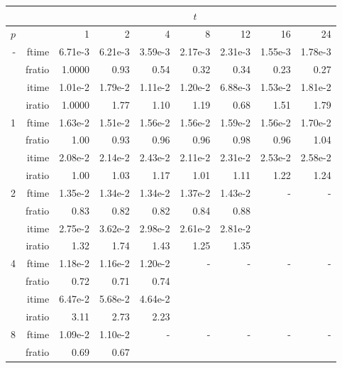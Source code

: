 \documentclass[a4]{article}
\begin{document}
\begin{table}
\begin{center}
\begin{tabular}{|r|r|r|r|r|r|r|r|r|}
\hline 
     &  & \multicolumn{7}{c|}{$t$} \\ \hline
    $p$  &  & 1           & 2    & 4    & 8    & 12   & 16    & 24  \\ \hline\hline
    -  & ftime &  6.71e-3 &   6.21e-3 &   3.59e-3 &   2.17e-3 &   2.31e-3 &   1.55e-3 &   1.78e-3    \\ 
      & fratio &  1.0000 &    0.93 &   0.54 &   0.32 &   0.34 &   0.23 &   0.27   \\ 
     & itime &    1.01e-2 &   1.79e-2 &   1.11e-2 &   1.20e-2 &   6.88e-3 &   1.53e-2 &   1.81e-2    \\ 
     & iratio &   1.0000 &    1.77 &    1.10 &    1.19 &    0.68 &   1.51 &    1.79    \\ \hline \hline
    1  & ftime &  1.63e-2 &   1.51e-2 &   1.56e-2 &   1.56e-2 &   1.59e-2 &   1.56e-2 &   1.70e-2    \\ 
      & fratio &  1.00 &   0.93 &   0.96 &   0.96 &   0.98 &   0.96 &   1.04    \\ 
     & itime &    2.08e-2 &   2.14e-2 &   2.43e-2 &   2.11e-2 &   2.31e-2 &   2.53e-2 &   2.58e-2    \\ 
     & iratio &   1.00 &   1.03 &   1.17 &   1.01 &   1.11 &   1.22 &   1.24    \\ \hline
    2  & ftime &  1.35e-2 &   1.34e-2 &   1.34e-2 &   1.37e-2 &   1.43e-2 &    - & - \\ 
      & fratio &  0.83 &   0.82 &   0.82 &   0.84 &   0.88 &      &  \\
      & itime &   2.75e-2 &   3.62e-2 &   2.98e-2 &   2.61e-2 &   2.81e-2 &      &  \\
      & iratio &  1.32 &   1.74 &   1.43 &   1.25 &   1.35 &      &  \\ \hline
    4  & ftime &  1.18e-2 &   1.16e-2 &   1.20e-2 &    - & - & - & - \\ 
      & fratio &  0.72 &   0.71 &   0.74 &      &  &  &  \\
      & itime &   6.47e-2 &   5.68e-2 &   4.64e-2 &      & & & \\
      & iratio &  3.11 &   2.73 &   2.23 &      & & &  \\ \hline
    8  & ftime &  1.09e-2 &   1.10e-2 &       - & - & - & - & - \\ 
      & fratio &  0.69 &   0.67 &        &  &  &  &  \\

\end{tabular}
\end{center}
\end{table}
\end{document}
